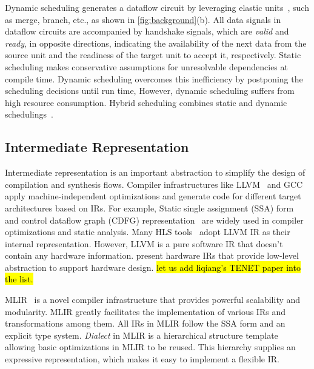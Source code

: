 Dynamic scheduling generates a dataflow circuit by leveraging elastic units~\cite{elastic_circuit}, such as merge, branch, etc., as shown in \autoref{fig:background}(b). All data signals in dataflow circuits are accompanied by handshake signals, which are \textit{valid} and \textit{ready}, in opposite directions, indicating the availability of the next data from the source unit and the readiness of the target unit to accept it, respectively. Static scheduling makes conservative assumptions for unresolvable dependencies at compile time. Dynamic scheduling overcomes this inefficiency by postponing the scheduling decisions until run time, However, dynamic scheduling suffers from high resource consumption. Hybrid scheduling combines static and dynamic schedulings~\cite{cheng_dss, find_islands}.

\subsection{Intermediate Representation}
Intermediate representation is an important abstraction to simplify the design of compilation and synthesis flows. Compiler infrastructures like LLVM~\cite{lattner2004llvm} and GCC~\cite{novillo2003tree} apply machine-independent optimizations and generate code for different target architectures based on IRs. For example, Static single assignment (SSA) form~\cite{StaticSingleAssignment} and control dataflow graph (CDFG) representation~\cite{cdfg_allen} are widely used in compiler optimizations and static analysis. Many HLS tools~\cite{VivadoHls, legup, Dynamatic_Josipovi,scalehls,scalehls} adopt LLVM IR as their internal representation. However, LLVM is a pure software IR that doesn't contain any hardware information. \cite{LLHD_Schuiki, firrtl, ahir,uIR_Sharifian, Calyx_Rachit} present hardware IRs that provide low-level abstraction to support hardware design. \hl{let us add liqiang's TENET paper into the list.} 



MLIR~\cite{mlir} is a novel compiler infrastructure that provides powerful scalability and modularity. MLIR greatly facilitates the implementation of various IRs and transformations among them. All IRs in MLIR follow the SSA form and an explicit type system. \emph{Dialect} in MLIR is a hierarchical structure template allowing basic optimizations in MLIR to be reused. This hierarchy supplies an expressive representation, which makes it easy to implement a flexible IR. 


